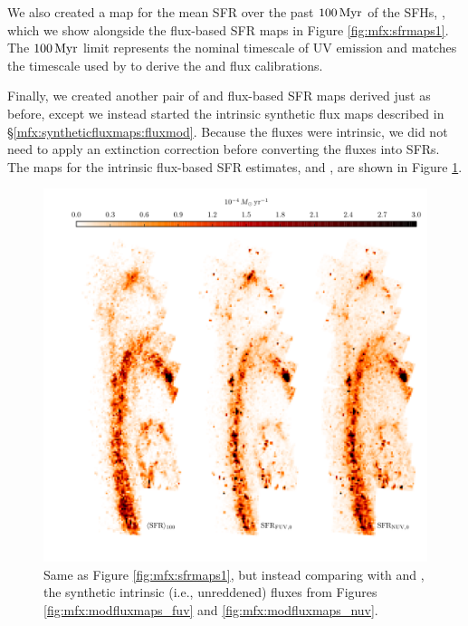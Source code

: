 We also created a map for the mean SFR over the past $100\,\mathrm{Myr}$ of the SFHs,
\sfroneh{}, which we show alongside the flux-based SFR maps in Figure
\ref{fig:mfx:sfrmaps1}. The $100\,\mathrm{Myr}$ limit represents the nominal timescale of
UV emission and matches the timescale used by \citet{Hao:2011} to derive the
\fuv{} and \nuv{} flux calibrations.

Finally, we created another pair of \fuv{} and \nuv{} flux-based SFR maps
derived just as before, except we instead started the intrinsic synthetic flux
maps described in \S \ref{mfx:syntheticfluxmaps:fluxmod}. Because the fluxes
were intrinsic, we did not need to apply an extinction correction before
converting the fluxes into SFRs. The maps for the intrinsic flux-based SFR
estimates, \sfrfuvz{} and \sfrnuvz{}, are shown in Figure
\ref{fig:mfx:sfrmaps2}.


\begin{figure}
\centering
\includegraphics[width=\textwidth]{m31flux-figures/sfrmaps2.pdf}
\caption[SFR maps from estimates based on synthetic intrinsic fluxes compared
    with the mean SFR map from the SFHs.]{Same as Figure
    \ref{fig:mfx:sfrmaps1}, but instead comparing \sfroneh{} with \sfrfuvz{}
    and \sfrnuvz{}, the synthetic intrinsic (i.e., unreddened) fluxes from
    Figures \ref{fig:mfx:modfluxmaps_fuv} and \ref{fig:mfx:modfluxmaps_nuv}.
}
\label{fig:mfx:sfrmaps2}
\end{figure}





